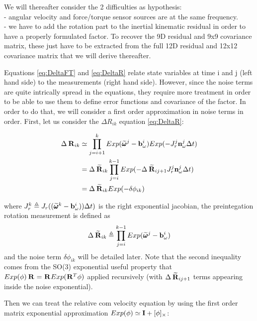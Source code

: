 \documentclass[11pt]{article}
\newcommand{\Rot}[2]{\prescript{#1}{}{\bfR}_{#2}}
\newcommand{\Rotm}[2]{\prescript{#1}{}{\widetilde{\bfR}}_{#2}}
\newcommand{\noise}{\bfn}
\newcommand{\bias}{\bfb}
\newcommand{\angvelm}[2]{\prescript{#1}{}{\widetilde{\pmb{\omega}}}_{#2}}
\newcommand{\Ident}{\bfI}
\begin{document}
We will thereafter consider the 2 difficulties as hypothesis: 
\\
- angular velocity and force/torque sensor sources are at the same frequency. 
\\
- we have to add the rotation part to the inertial kinematic residual in order to have a properly formulated factor. To recover the 9D residual and 9x9 covariance matrix, these just have to be extracted from the full 12D residual and 12x12 covariance matrix that we will derive thereafter.


Equations \ref{eq:DeltaFT} and \ref{eq:DeltaR} relate state variables at time i and j (left hand side) to the measurements (right hand side). However, since the noise terms are quite intrically spread in the equations, they require more treatment in order to be able to use them to define error functions and covariance of the factor. In order to do that, we will consider a first order approximation in noise terms in order. First, let us consider the $\Delta R_{ik}$ equation \ref{eq:DeltaR}:

\begin{equation}
\begin{split}
\Delta \Rot{}{ik} &\simeq  \prod_{j=i+1}^{k} Exp(\angvelm{}{}^j - \bias_{\omega}^i) Exp(-J^j_r \noise_{\omega}^j\Delta t)
\\
&= \Delta \Rotm{}{ik}\prod_{j=i}^{k-1} Exp(- \Delta \Rotm{}{ij+1} J^j_r \noise_{\omega}^j\Delta t)
\\
&= \Delta \Rotm{}{ik}Exp(-\delta \phi_{ik})
\end{split}
\end{equation}

where $J^k_r \triangleq J_r((\angvelm{}{}^k - \bias_{\omega}^i))\Delta t)$ is the right exponential jacobian, the preintegation rotation measurement is defined as 
\begin{equation}
    \Delta \Rotm{}{ik} \triangleq \prod_{j=i}^{k-1} Exp(\angvelm{}{}^j - \bias_{\omega}^i)
\end{equation}
and the noise term $\delta \phi_{ik}$ will be detailed later. Note that the second inequality comes from the SO(3) exponential useful property that $ Exp(\phi)\Rot{}{} = \Rot{}{} Exp(\Rot{}{}^T \phi)$ applied recursively (with $\Delta \Rotm{}{ij+1}$ terms appearing inside the noise exponential).

Then we can treat the relative com velocity equation by using the first order matrix exponential approximation $Exp(\phi) \simeq \Ident + [\phi]_{\times}$:
\end{document}

